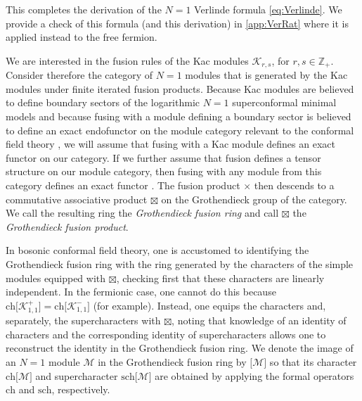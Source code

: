 \documentclass[a4paper,reqno,12pt]{report}
\theoremstyle{definition}
\numberwithin{equation}{section}
\newcommand{\ZZ}{\mathbb{Z}}
\newcommand{\Kac}[1]{\mathcal{K}_{#1}}       %
\newcommand{\chmap}{\mathrm{ch}}
\newcommand{\schmap}{\mathrm{sch}}
\newcommand{\Gr}[1]{\bigl[ #1 \bigr]}            %
\newcommand{\ch}[1]{\chmap \Gr{#1}}              %
\newcommand{\sch}[1]{\schmap \Gr{#1}}              %
\newcommand{\fuse}{\mathbin{\times}}                                            %
\newcommand{\Grfuse}{\mathbin{\boxtimes}}                                       %
\newcommand{\cft}{conformal field theory}
\theoremstyle{plain}
\newcommand{\Mod}[1]{\mathcal{#1}}                 %
\begin{document}
This completes the derivation of the $N=1$ Verlinde formula \eqref{eq:Verlinde}.  We provide a check of this formula (and this derivation) in \cref{app:VerRat} where it is applied instead to the free fermion.

We are interested in the fusion rules of the Kac modules $\Kac{r,s}$, for $r,s \in \ZZ_+$.  Consider therefore the category of $N=1$ modules that is generated by the Kac modules under finite iterated fusion products.  Because Kac modules are believed to define boundary sectors of the logarithmic $N=1$ superconformal minimal models \cite{PeaLog14} and because fusing with a module defining a boundary sector is believed to define an exact endofunctor on the module category relevant to the \cft{} \cite{GabFus09}, we will assume that fusing with a Kac module defines an exact functor on our category.  If we further assume that fusion defines a tensor structure on our module category, then fusing with any module from this category defines an exact functor \cite{EtiTen09}.  The fusion product $\fuse$ then descends to a commutative associative product $\Grfuse$ on the Grothendieck group of the category.  We call the resulting ring the \emph{Grothendieck fusion ring} and call $\Grfuse$ the \emph{Grothendieck fusion product}.

In bosonic \cft{}, one is accustomed to identifying the Grothendieck fusion ring with the ring generated by the characters of the simple modules equipped with $\Grfuse$, checking first that these characters are linearly independent.  In the fermionic case, one cannot do this because $\ch{\Kac{1,1}^+} = \ch{\Kac{1,1}^-}$ (for example).  Instead, one equips the characters and, separately, the supercharacters with $\Grfuse$, noting that knowledge of an identity of characters and the corresponding identity of supercharacters allows one to reconstruct the identity in the Grothendieck fusion ring.  We denote the image of an $N=1$ module $\Mod{M}$ in the Grothendieck fusion ring by $\Gr{\Mod{M}}$ so that its character $\ch{\Mod{M}}$ and supercharacter $\sch{\Mod{M}}$ are obtained by applying the formal operators $\chmap$ and $\schmap$, respectively.
\end{document}
